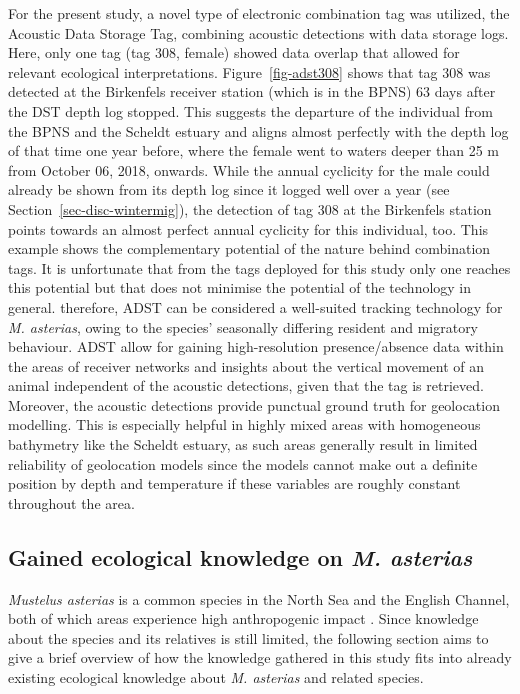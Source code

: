 \documentclass[
  authoryear,
  review,
  3p]{elsarticle}
\begin{document}
For the present study, a novel type of electronic combination tag was
utilized, the Acoustic Data Storage Tag, combining acoustic detections
with data storage logs. Here, only one tag (tag 308, female) showed data
overlap that allowed for relevant ecological interpretations.
Figure~\ref{fig-adst308} shows that tag 308 was detected at the
Birkenfels receiver station (which is in the BPNS) 63 days after the DST
depth log stopped. This suggests the departure of the individual from
the BPNS and the Scheldt estuary and aligns almost perfectly with the
depth log of that time one year before, where the female went to waters
deeper than 25 m from October 06, 2018, onwards. While the annual
cyclicity for the male could already be shown from its depth log since
it logged well over a year (see Section~\ref{sec-disc-wintermig}), the
detection of tag 308 at the Birkenfels station points towards an almost
perfect annual cyclicity for this individual, too. This example shows
the complementary potential of the nature behind combination tags. It is
unfortunate that from the tags deployed for this study only one reaches
this potential but that does not minimise the potential of the
technology in general. therefore, ADST can be considered a well-suited
tracking technology for \emph{M. asterias}, owing to the species'
seasonally differing resident and migratory behaviour. ADST allow for
gaining high-resolution presence/absence data within the areas of
receiver networks and insights about the vertical movement of an animal
independent of the acoustic detections, given that the tag is retrieved.
Moreover, the acoustic detections provide punctual ground truth for
geolocation modelling. This is especially helpful in highly mixed areas
with homogeneous bathymetry like the Scheldt estuary, as such areas
generally result in limited reliability of geolocation models since the
models cannot make out a definite position by depth and temperature if
these variables are roughly constant throughout the area.

\hypertarget{sec-disc-otherspecies}{%
\subsection{\texorpdfstring{Gained ecological knowledge on \emph{M.
asterias}}{Gained ecological knowledge on M. asterias}}\label{sec-disc-otherspecies}}

\emph{Mustelus asterias} is a common species in the North Sea and the
English Channel, both of which areas experience high anthropogenic
impact \citep{hernandezfarinas_2014}. Since knowledge about the species
and its relatives is still limited, the following section aims to give a
brief overview of how the knowledge gathered in this study fits into
already existing ecological knowledge about \emph{M. asterias} and
related species.
\end{document}
